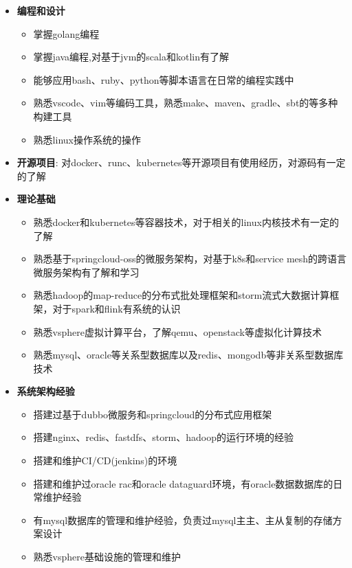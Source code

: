 \begin{itemize}[parsep=0.2ex]
  \item \textbf{编程和设计}
    \begin{itemize}
      \item 掌握golang编程
      \item 掌握java编程,对基于jvm的scala和kotlin有了解
      \item 能够应用bash、ruby、python等脚本语言在日常的编程实践中
      \item 熟悉vscode、vim等编码工具，熟悉make、maven、gradle、sbt的等多种构建工具
      \item 熟悉linux操作系统的操作
    \end{itemize}
  \item \textbf{开源项目}: 对docker、runc、kubernetes等开源项目有使用经历，对源码有一定的了解
  \item \textbf{理论基础}
    \begin{itemize}
      \item 熟悉docker和kubernetes等容器技术，对于相关的linux内核技术有一定的了解
      \item 熟悉基于springcloud-oss的微服务架构，对基于k8s和service mesh的跨语言微服务架构有了解和学习
      \item 熟悉hadoop的map-reduce的分布式批处理框架和storm流式大数据计算框架，对于spark和flink有系统的认识
      \item 熟悉vsphere虚拟计算平台，了解qemu、openstack等虚拟化计算技术
      \item 熟悉mysql、oracle等关系型数据库以及redis、mongodb等非关系型数据库技术
    \end{itemize}
  \item \textbf{系统架构经验}
    \begin{itemize}
      \item 搭建过基于dubbo微服务和springcloud的分布式应用框架
      \item 搭建nginx、redis、fastdfs、storm、hadoop的运行环境的经验
      \item 搭建和维护CI/CD(jenkins)的环境
      \item 搭建和维护过oracle rac和oracle dataguard环境，有oracle数据数据库的日常维护经验
      \item 有mysql数据库的管理和维护经验，负责过mysql主主、主从复制的存储方案设计
      \item 熟悉vsphere基础设施的管理和维护
    \end{itemize}
\end{itemize}
